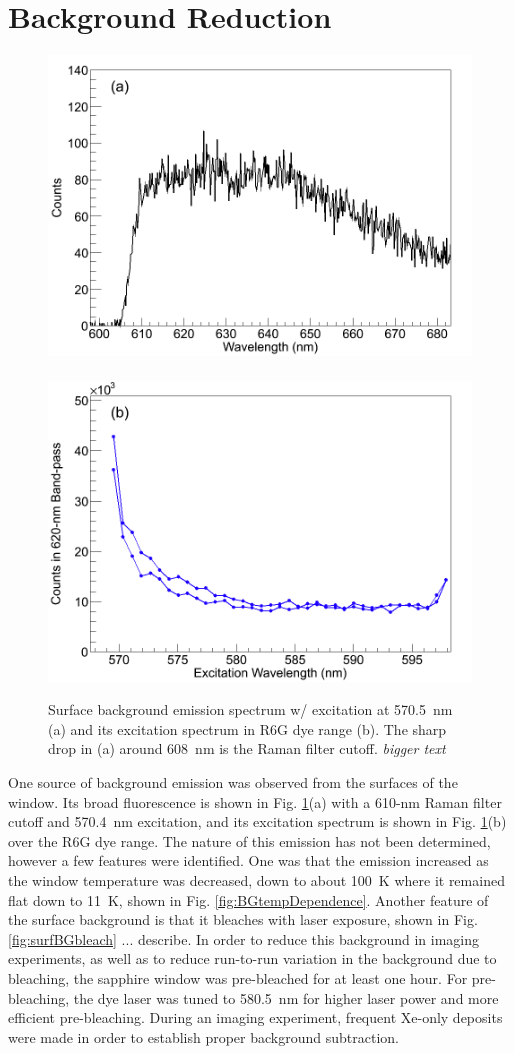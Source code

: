 
\section{Background Reduction}
\label{sec:bgs}

\begin{figure} %
        \centering
                \includegraphics[width=.5\textwidth]{figures/surfaceBG_a.png}
                ~
                \includegraphics[width=.5\textwidth]{figures/surfaceBG_b.png}
                \caption{Surface background emission spectrum w/ excitation at 570.5~nm (a) and its excitation spectrum in R6G dye range (b).  The sharp drop in (a) around 608~nm is the Raman filter cutoff. \emph{\color{gray}bigger text}}
\label{fig:surfBG}
\end{figure}

One source of background emission was observed from the surfaces of the window.  Its broad fluorescence is shown in Fig. \ref{fig:surfBG}(a) with a 610-nm Raman filter cutoff and 570.4~nm excitation, and its excitation spectrum is shown in Fig. \ref{fig:surfBG}(b) over the R6G dye range.  The nature of this emission has not been determined, however a few features were identified.  One was that the emission increased as the window temperature was decreased, down to about 100~K where it remained flat down to 11~K, shown in Fig. \ref{fig:BGtempDependence}.  Another feature of the surface background is that it bleaches with laser exposure, shown in Fig. \ref{fig:surfBGbleach} ... describe.  In order to reduce this background in imaging experiments, as well as to reduce run-to-run variation in the background due to bleaching, the sapphire window was pre-bleached for at least one hour.  For pre-bleaching, the dye laser was tuned to 580.5~nm for higher laser power and more efficient pre-bleaching.  During an imaging experiment, frequent Xe-only deposits were made in order to establish proper background subtraction.  

